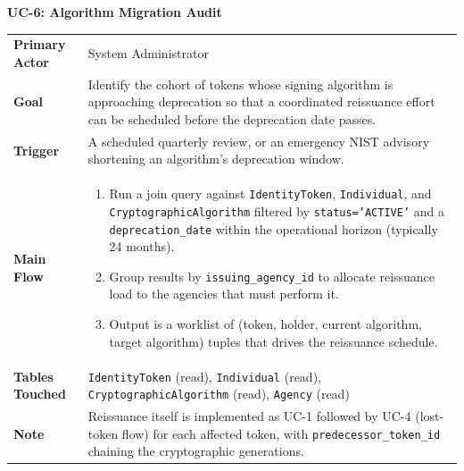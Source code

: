 \documentclass[11pt,letterpaper]{article}
\newcommand{\entity}[1]{\texttt{\color{navydark}#1}}
\newcommand{\usecase}[2]{%
  \needspace{3\baselineskip}%
  \vspace{6pt}%
  \noindent\colorbox{tabheader}{\parbox{\dimexpr\textwidth-2\fboxsep}{%
    \color{white}\small\bfseries\textsc{#1:} \mdseries #2}}%
  \nopagebreak[4]%
  \vspace{2pt}%
  \nopagebreak[4]%
}
\begin{document}
\usecase{UC-6}{Algorithm Migration Audit}
\noindent\begin{xltabular}{\textwidth}{>{\bfseries}p{1.4in} >{\RaggedRight\arraybackslash}X}
Primary Actor & System Administrator \\
Goal & Identify the cohort of tokens whose signing algorithm is approaching deprecation so that a coordinated reissuance effort can be scheduled before the deprecation date passes. \\
Trigger & A scheduled quarterly review, or an emergency NIST advisory shortening an algorithm's deprecation window. \\
Main Flow &
\begin{enumerate}
  \item Run a join query against \entity{IdentityToken}, \entity{Individual}, and \entity{CryptographicAlgorithm} filtered by \texttt{status='ACTIVE'} and a \texttt{deprecation\_date} within the operational horizon (typically 24 months).
  \item Group results by \texttt{issuing\_agency\_id} to allocate reissuance load to the agencies that must perform it.
  \item Output is a worklist of (token, holder, current algorithm, target algorithm) tuples that drives the reissuance schedule.
\end{enumerate} \\
Tables Touched & \entity{IdentityToken} (read), \entity{Individual} (read), \entity{CryptographicAlgorithm} (read), \entity{Agency} (read) \\
Note & Reissuance itself is implemented as UC-1 followed by UC-4 (lost-token flow) for each affected token, with \texttt{predecessor\_token\_id} chaining the cryptographic generations. \\
\end{xltabular}
\end{document}
